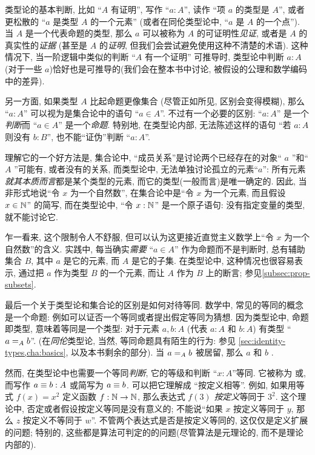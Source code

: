 类型论的基本判断, 比如 ``$A$ 有证明'', 写作 ``$a:A$'', 读作 ``项 $a$ 的类型是 $A$'', 或者更松散的 ``$a$ 是类型 $A$ 的一个元素'' (或者在同伦类型论中, ``$a$ 是 $A$ 的一个点'').
%
%
%
当 $A$ 是一个代表命题的类型, 那么 $a$ 可以被称为 $A$ 的可证明性\emph{见证}, 或者是 $A$ 的真实性的\emph{证据}
(甚至是 $A$ 的\emph{证明}, 但我们会尝试避免使用这种不清楚的术语).
这种情况下, 当一阶逻辑中类似的判断 ``$A$ 有一个证明'' 可推导时, 类型论中判断 $a:A$ (对于一些 $a$)恰好也是可推导的(我们会在整本书中讨论, 被假设的公理和数学编码中的差异).

另一方面, 如果类型 $A$ 比起命题更像集合 (尽管正如所见, 区别会变得模糊), 那么 ``$a:A$'' 可以视为是集合论中的语句 ``$a\in A$''.
不过有一个必要的区别: ``$a:A$'' 是一个\emph{判断}而 ``$a\in A$'' 是一个\emph{命题}.
特别地, 在类型论内部, 无法陈述这样的语句 ``若 $a:A$ 则没有 $b:B$'', 也不能``证伪''判断 ``$a:A$''.

理解它的一个好方法是, 集合论中, ``成员关系''是讨论两个已经存在的对象`` $a$ ''和`` $A$ ''可能有, 或者没有的关系, 而类型论中, 无法单独讨论孤立的元素``$a$'': 所有元素\emph{就其本质而言}都是某个类型的元素, 而它的类型(一般而言)是唯一确定的.
因此, 当非形式地说``令 $x$ 为一个自然数'', 在集合论中是``令 $x$ 为一个元素, 而且假设 $x\in\nat$'' 的简写, 而在类型论中, ``令 $x:\nat$'' 是一个原子语句: 没有指定变量的类型, 就不能讨论它.
%

乍一看来, 这个限制令人不舒服, 但可以认为这更接近直觉主义数学上``令 $x$ 为一个自然数''的含义.
实践中, 每当确实\emph{需要} ``$a\in A$'' 作为命题而不是判断时, 总有辅助集合 $B$, 其中 $a$ 是它的元素, 而 $A$ 是它的子集.
在类型论中, 这种情况也很容易表示, 通过把 $a$ 作为类型 $B$ 的一个元素, 而让 $A$ 作为 $B$ 上的断言;
参见\cref{subsec:prop-subsets}.

最后一个关于类型论和集合论的区别是如何对待等同.
数学中, 常见的等同的概念是一个命题: 例如可以证否一个等同或者提出假定等同为猜想.
因为类型论中, 命题即类型, 意味着等同是一个类型: 对于元素 $a,b:A$ (代表 $a:A$ 和 $b:A$) 有类型 ``$\id[A]ab$''.
(在\emph{同伦}类型论, 当然, 等同命题具有陌生的行为: 参见 \cref{sec:identity-types,cha:basics}, 以及本书剩余的部分).
当 $\id[A]ab$ 被居留, 那么 $a$ 和 $b$ .
%
%

然而, 在类型论中也需要一个等同\emph{判断}, 它的等级和判断 ``$x:A$''等同.
%
%
它被称为%
%
%
或,
%
%
而写作 $a\jdeq b : A$ 或简写为 $a \jdeq b$.
可以把它理解成 ``按定义相等''.
例如, 如果用等式 $f(x)=x^2$ 定义函数 $f:\nat\to\nat$, 那么表达式 $f(3)$ \emph{按定义}等同于 $3^2$.
这个理论中, 否定或者假设按定义等同是没有意义的;
不能说``如果 $x$ 按定义等同于 $y$, 那么 $z$ 按定义不等同于 $w$''.
不管两个表达式是否是按定义等同的, 这仅仅是定义扩展的问题;
特别的, 这些都是算法可判定的的问题(尽管算法是元理论的, 而不是理论内部的).
%

